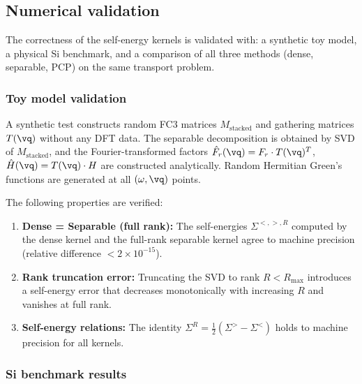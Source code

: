 \subsection{Numerical validation}
\label{sub:validation_anharmonic}

The correctness of the self-energy kernels is validated with:
a synthetic toy model, a physical Si benchmark, and a comparison of all
three methods (dense, separable, PCP) on the same transport problem.

\subsubsection{Toy model validation}
\label{sssub:toy_model}

A synthetic test constructs random FC3 matrices $M_\mathrm{stacked}$
and gathering matrices $T(\vq)$ without any DFT data.  The separable
decomposition is obtained by SVD of $M_\mathrm{stacked}$, and the
Fourier-transformed factors $\hat{F}_r(\vq) = F_r \cdot T(\vq)^T$,
$\hat{H}(\vq) = T(\vq) \cdot H$ are constructed analytically.  Random
Hermitian Green's functions are generated at all $(\omega, \vq)$ points.

The following properties are verified:
\begin{enumerate}
  \item \textbf{Dense = Separable (full rank):}
    The self-energies $\Sigma^{<,>,R}$ computed by the dense kernel and
    the full-rank separable kernel agree to machine precision
    (relative difference $< 2 \times 10^{-15}$).

  \item \textbf{Rank truncation error:}
    Truncating the SVD to rank $R < R_\mathrm{max}$ introduces a
    self-energy error that decreases monotonically with increasing $R$
    and vanishes at full rank.

  \item \textbf{Self-energy relations:}
    The identity $\Sigma^R = \tfrac{1}{2}(\Sigma^> - \Sigma^<)$ holds
    to machine precision for all kernels.
\end{enumerate}


\subsubsection{Si benchmark results}
\label{sssub:si_benchmark}

